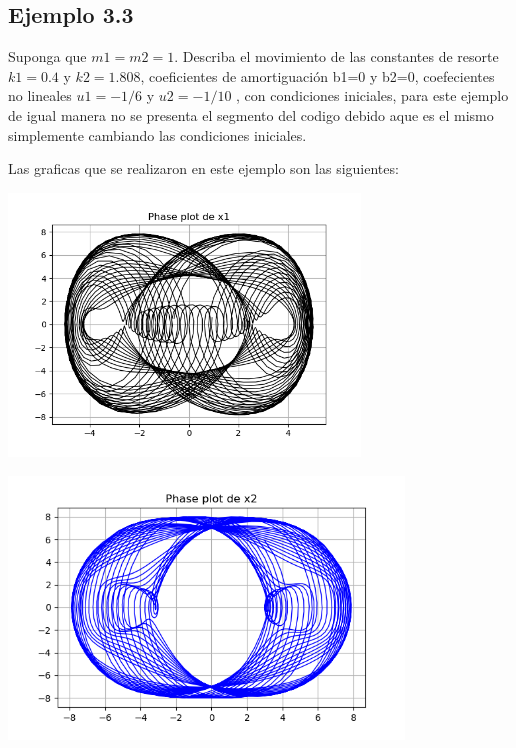 \documentclass{article}
\begin{document}
\subsection{Ejemplo 3.3}

Suponga que $m1=m2=1$. Describa el movimiento de las constantes de resorte $k1=0.4$ y $k2=1.808$, coeficientes de amortiguación b1=0 y b2=0, coefecientes no lineales $u1=-1/6$ y $u2=-1/10$ , con condiciones iniciales, para este ejemplo de igual manera no se presenta el segmento del codigo debido aque es el mismo simplemente cambiando las condiciones iniciales.


Las graficas que se realizaron en este ejemplo son las siguientes:

\begin{center}
\includegraphics[height=7cm]{nolineal3_3_1.png}
\end{center}

\begin{center}
\includegraphics[height=7cm]{nolineal3_3_2.png}
\end{center}
\end{document}
